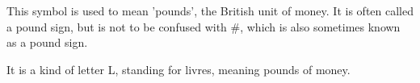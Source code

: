 This symbol is used to mean 'pounds', the British unit of money. It is often called
a pound sign, but is not to be confused with \#, which is also sometimes
known as a pound sign.
\par
It is a kind of letter L, standing for livres, meaning pounds of money.